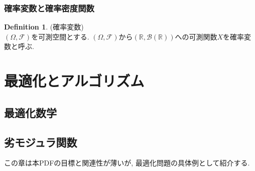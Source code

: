 \documentclass[11pt, a4paper, dvipdfmx]{jsbook}
\theoremstyle{definition}
\newtheorem{Definition+}[Axiom+]{Definition}
\newcommand{\R}{\mathbb{R}}
\newcommand{\F}{\mathcal{F}}
\newcommand{\Borel}{\mathcal{B}(\R)}
\begin{document}
\section{確率変数と確率密度関数}
\begin{Definition+}(確率変数)\\
  $(\Omega, \F)$を可測空間とする. $(\Omega, \F)$から$(\R, \Borel)$への可測関数$X$を確率変数と呼ぶ.
\end{Definition+}
\part{最適化とアルゴリズム}
\chapter{最適化数学}
\chapter{劣モジュラ関数}
この章は本PDFの目標と関連性が薄いが, 最適化問題の具体例として紹介する. 
\end{document}
